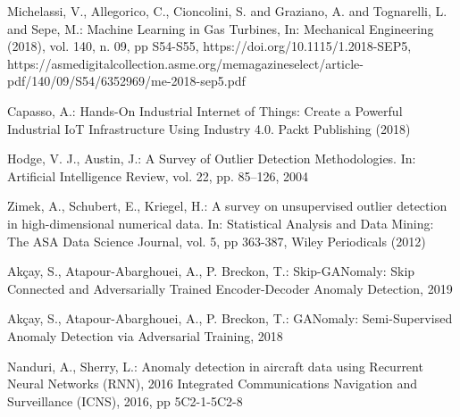 \documentclass[runningheads]{llncs}
\begin{document}
%
%
%
% 
% 
%
\begin{thebibliography}{18}

    Michelassi, V., Allegorico, C., Cioncolini, S. and Graziano, A. and Tognarelli, L. and Sepe, M.: Machine Learning in Gas Turbines, In: Mechanical Engineering (2018), vol. 140, n. 09, pp S54-S55, 
    https://doi.org/10.1115/1.2018-SEP5, https://asmedigitalcollection.asme.org/memagazineselect/article-pdf/140/09/S54/6352969/me-2018-sep5.pdf

Capasso, A.: Hands-On Industrial Internet of Things: Create a Powerful Industrial IoT Infrastructure 
Using Industry 4.0. Packt Publishing (2018)

Hodge, V. J., Austin, J.: A Survey of Outlier Detection Methodologies. In: Artificial Intelligence Review,
vol. 22, pp. 85--126, 2004


Zimek, A., Schubert, E., Kriegel, H.: A survey on unsupervised outlier detection in high-dimensional numerical data. In: Statistical Analysis and Data Mining: The ASA Data Science Journal, vol. 5, pp 363-387, Wiley Periodicals (2012)


Akçay, S.,  Atapour-Abarghouei, A., P. Breckon, T.: Skip-GANomaly: Skip Connected and Adversarially Trained Encoder-Decoder Anomaly Detection, 2019


Akçay, S.,  Atapour-Abarghouei, A., P. Breckon, T.: GANomaly: Semi-Supervised Anomaly Detection via Adversarial Training, 2018


Nanduri, A., Sherry, L.: Anomaly detection in aircraft data using Recurrent Neural Networks (RNN), 2016 Integrated Communications Navigation and Surveillance (ICNS), 2016, pp 5C2-1-5C2-8


\end{thebibliography}
\end{document}
